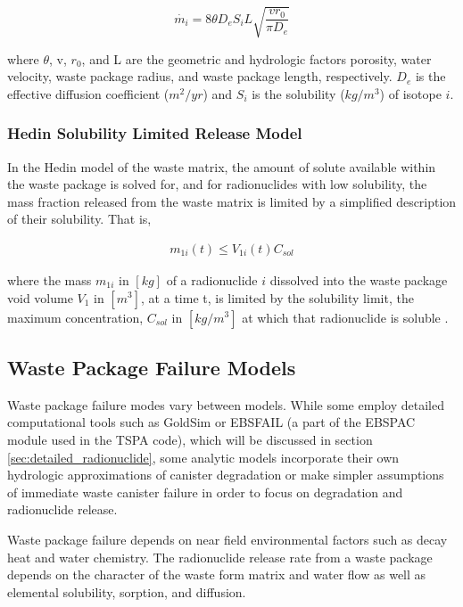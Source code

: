\begin{equation}
 \dot{m_i}=8\theta D_eS_iL\sqrt{\frac{vr_0}{\pi D_e}}
\end{equation} 

where $\theta$, v, $r_0$, and L are the geometric and
hydrologic factors porosity, water velocity, waste package radius, and waste
package length, respectively. $D_e$ is the effective diffusion coefficient
($m^2/yr$)  and $S_i$ is the solubility ($kg/m^3$) of isotope $i$.


\subsubsection{Hedin Solubility Limited Release Model}

In the Hedin model of the waste matrix, the amount of solute available within
the waste package is solved for, and for radionuclides with low solubility, the mass
fraction released from the waste matrix is limited by a simplified description
of their solubility. That is, 

\begin{align} 
  m_{1i}(t)\le V_{1i}(t)C_{sol}
\end{align}

where the mass $m_{1i}$ in $[kg]$ of a radionuclide $i$ dissolved into the waste package
void volume $V_1$ in $[m^3]$, at a time t, is limited by the solubility limit, 
the maximum concentration, $C_{sol}$ in $[kg/m^3]$ at which that radionuclide is 
soluble \cite{hedin_integrated_2002}.


\subsection{Waste Package Failure Models}

Waste package failure modes vary between models. While some employ detailed 
computational tools such as GoldSim or EBSFAIL (a part of the EBSPAC module 
used in the TSPA code), which will be discussed in section 
\ref{sec:detailed_radionuclide}, some 
analytic models incorporate their own hydrologic approximations of
canister degradation or make simpler assumptions of immediate waste canister 
failure in order to focus on degradation and radionuclide release. 


Waste package failure depends on near field environmental factors such as decay 
heat and water chemistry.  
The radionuclide release rate from a waste 
package depends on the character of the waste form matrix and water flow as 
well as elemental solubility, sorption, and diffusion. 


